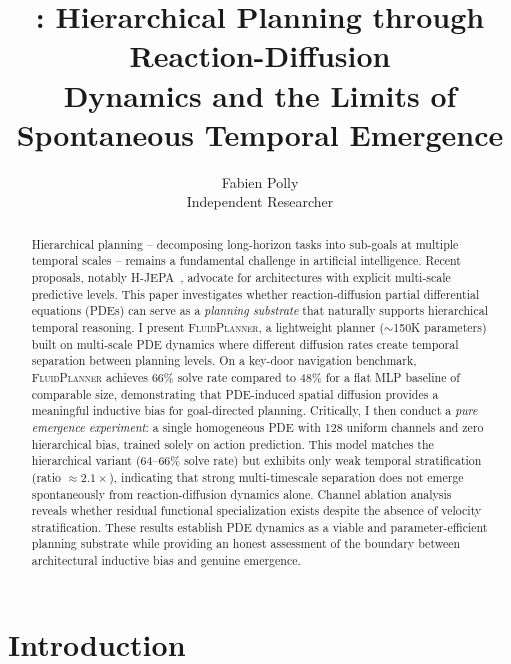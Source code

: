 \documentclass{article}
\title{\fluidplanner{}: Hierarchical Planning through Reaction-Diffusion\\Dynamics and the Limits of Spontaneous Temporal Emergence}
\author{
  Fabien Polly \\
  Independent Researcher \\
}
\newcommand{\fluidplanner}{\textsc{FluidPlanner}}
\begin{document}
\maketitle

\begin{abstract}
Hierarchical planning -- decomposing long-horizon tasks into sub-goals at multiple temporal scales -- remains a fundamental challenge in artificial intelligence. Recent proposals, notably H-JEPA~\cite{lecun2022path}, advocate for architectures with explicit multi-scale predictive levels. This paper investigates whether reaction-diffusion partial differential equations (PDEs) can serve as a \emph{planning substrate} that naturally supports hierarchical temporal reasoning. I present \fluidplanner{}, a lightweight planner ($\sim$150K parameters) built on multi-scale PDE dynamics where different diffusion rates create temporal separation between planning levels. On a key-door navigation benchmark, \fluidplanner{} achieves 66\% solve rate compared to 48\% for a flat MLP baseline of comparable size, demonstrating that PDE-induced spatial diffusion provides a meaningful inductive bias for goal-directed planning. Critically, I then conduct a \emph{pure emergence experiment}: a single homogeneous PDE with 128 uniform channels and zero hierarchical bias, trained solely on action prediction. This model matches the hierarchical variant (64--66\% solve rate) but exhibits only weak temporal stratification (ratio $\approx 2.1\times$), indicating that strong multi-timescale separation does not emerge spontaneously from reaction-diffusion dynamics alone. Channel ablation analysis reveals whether residual functional specialization exists despite the absence of velocity stratification. These results establish PDE dynamics as a viable and parameter-efficient planning substrate while providing an honest assessment of the boundary between architectural inductive bias and genuine emergence.
\end{abstract}

\section{Introduction}
\label{sec:introduction}
\end{document}
